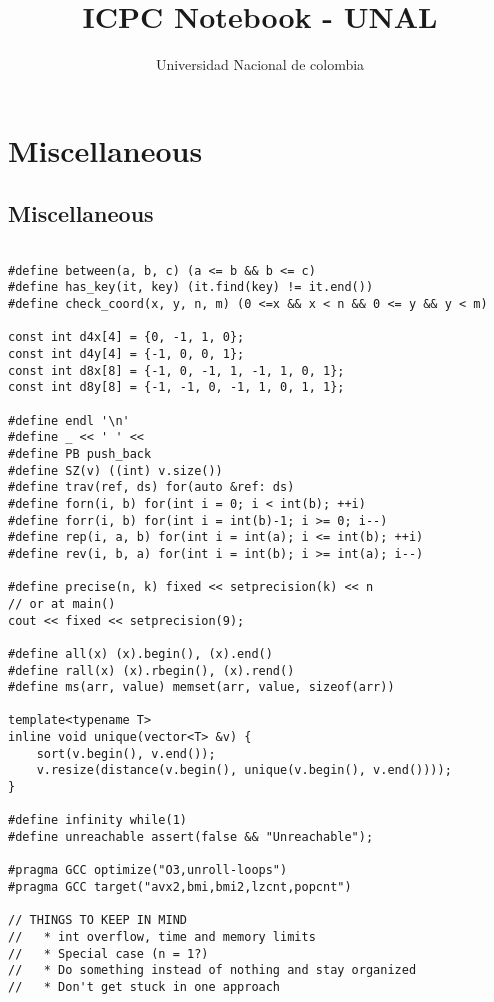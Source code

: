 \documentclass[10pt,letterpaper,twocolumn,twosided]{article}
\begin{document}
\title{ICPC Notebook - UNAL}
\author{Universidad Nacional de colombia}
\maketitle
\tableofcontents
{}

\section{Miscellaneous}

\subsection{Miscellaneous}
\begin{lstlisting}

#define between(a, b, c) (a <= b && b <= c)
#define has_key(it, key) (it.find(key) != it.end())
#define check_coord(x, y, n, m) (0 <=x && x < n && 0 <= y && y < m)

const int d4x[4] = {0, -1, 1, 0};
const int d4y[4] = {-1, 0, 0, 1};
const int d8x[8] = {-1, 0, -1, 1, -1, 1, 0, 1};
const int d8y[8] = {-1, -1, 0, -1, 1, 0, 1, 1};

#define endl '\n'
#define _ << ' ' <<
#define PB push_back
#define SZ(v) ((int) v.size())
#define trav(ref, ds) for(auto &ref: ds)
#define forn(i, b) for(int i = 0; i < int(b); ++i)
#define forr(i, b) for(int i = int(b)-1; i >= 0; i--)
#define rep(i, a, b) for(int i = int(a); i <= int(b); ++i)
#define rev(i, b, a) for(int i = int(b); i >= int(a); i--)

#define precise(n, k) fixed << setprecision(k) << n
// or at main()
cout << fixed << setprecision(9);

#define all(x) (x).begin(), (x).end()
#define rall(x) (x).rbegin(), (x).rend()
#define ms(arr, value) memset(arr, value, sizeof(arr))

template<typename T>
inline void unique(vector<T> &v) {
    sort(v.begin(), v.end());
    v.resize(distance(v.begin(), unique(v.begin(), v.end())));
}

#define infinity while(1)
#define unreachable assert(false && "Unreachable");

#pragma GCC optimize("O3,unroll-loops")
#pragma GCC target("avx2,bmi,bmi2,lzcnt,popcnt")

// THINGS TO KEEP IN MIND
//   * int overflow, time and memory limits
//   * Special case (n = 1?)
//   * Do something instead of nothing and stay organized
//   * Don't get stuck in one approach
 

\end{lstlisting}
\end{document}
